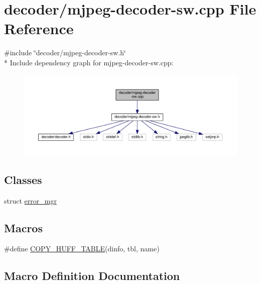 \hypertarget{mjpeg-decoder-sw_8cpp}{}\section{decoder/mjpeg-\/decoder-\/sw.cpp File Reference}
\label{mjpeg-decoder-sw_8cpp}
{\ttfamily \#include \char`\"{}decoder/mjpeg-\/decoder-\/sw.\+h\char`\"{}}\\*
Include dependency graph for mjpeg-\/decoder-\/sw.cpp\+:
\nopagebreak
\begin{figure}[H]
\begin{center}
\leavevmode
\includegraphics[width=350pt]{mjpeg-decoder-sw_8cpp__incl}
\end{center}
\end{figure}
\subsection*{Classes}
\begin{DoxyCompactItemize}
\item 
struct \hyperlink{structerror__mgr}{error\+\_\+mgr}
\end{DoxyCompactItemize}
\subsection*{Macros}
\begin{DoxyCompactItemize}
\item 
\#define \hyperlink{mjpeg-decoder-sw_8cpp_a3b7d514bed96e59bd95921d36f7b596c}{C\+O\+P\+Y\+\_\+\+H\+U\+F\+F\+\_\+\+T\+A\+B\+LE}(dinfo,  tbl,  name)
\end{DoxyCompactItemize}


\subsection{Macro Definition Documentation}
